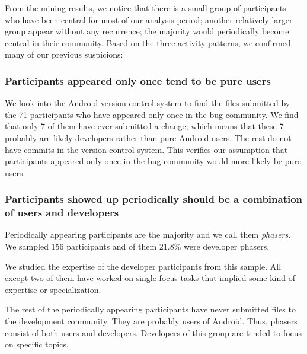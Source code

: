 \documentclass[10pt, conference, compsocconf]{IEEEtran}
\begin{document}
From the mining results, we notice that there is a small group of
participants who have been central for most of our analysis period; another
relatively larger group appear without any recurrence; the majority
would periodically become central in their community. Based on the
three activity patterns, we confirmed many of our previous suspicions:

\subsubsection{Participants appeared only once tend to be pure users}

We look into the Android version control system to find the files
submitted by the 71 participants who have appeared only once in the
bug community. We find that only 7 of them have ever submitted a
change, which means that these 7 probably are likely developers rather
than pure Android users. The rest do not have commits in the version
control system. This verifies our assumption that participants
appeared only once in the bug community would more likely be pure
users.

\subsubsection{Participants showed up periodically should be a combination of users and developers}

Periodically appearing participants are the majority and we call them
\emph{phasers}. 
We sampled 156 participants and of them $21.8\%$ were developer phasers.

We studied the expertise of the developer participants from this
sample. All except two of them have worked on single focus tasks that
implied some kind of expertise or specialization.

The rest of the periodically appearing participants have never
submitted files to the development community. They are probably users
of Android. Thus, phasers consist of both users and
developers. Developers of this group are tended to focus on specific
topics.
\end{document}
